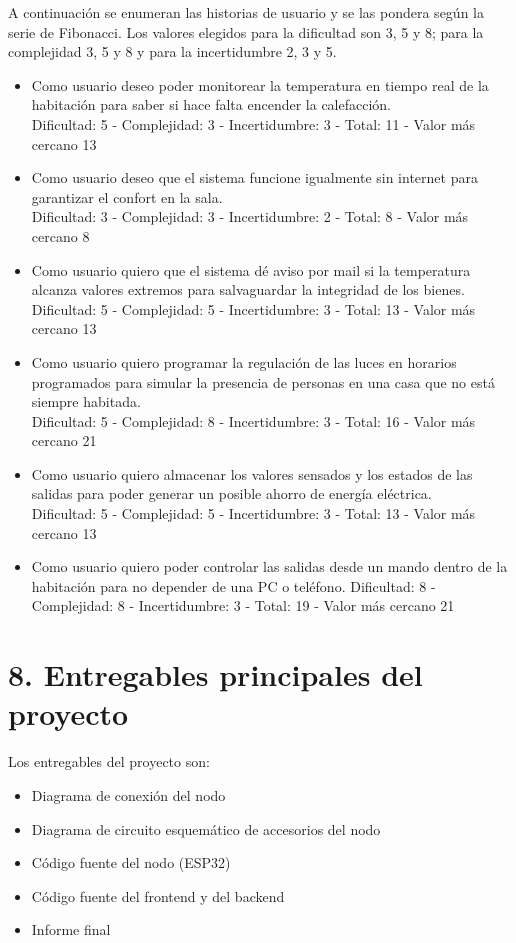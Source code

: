 \documentclass[
11pt, %
]{charter}
\begin{document}
A continuación se enumeran las historias de usuario y se las pondera según la serie de Fibonacci. Los valores elegidos para la dificultad son 3, 5 y 8; para la complejidad 3, 5 y 8 y para la incertidumbre 2, 3 y 5.
\begin{itemize}
	\item Como usuario deseo poder monitorear la temperatura en tiempo real de la habitación para saber si hace falta encender la calefacción. \\
Dificultad: 5 - Complejidad: 3 - Incertidumbre: 3	 - Total: 11 - Valor más cercano 13
	\item Como usuario deseo que el sistema funcione igualmente sin internet para garantizar el confort en la sala. \\
Dificultad: 3 - Complejidad: 3 - Incertidumbre: 2	 - Total: 8 - Valor más cercano 8	
	\item Como usuario quiero que el sistema dé aviso por mail si la temperatura alcanza valores extremos para salvaguardar la integridad de los bienes. \\
Dificultad: 5 - Complejidad: 5 - Incertidumbre: 3	 - Total: 13 - Valor más cercano 13
	\item Como usuario quiero programar la regulación de las luces en horarios programados para simular la presencia de personas en una casa que no está siempre habitada. \\
Dificultad: 5 - Complejidad: 8 - Incertidumbre: 3	 - Total: 16 - Valor más cercano 21
	\item Como usuario quiero almacenar los valores sensados y los estados de las salidas para poder generar un posible ahorro de energía eléctrica. \\
Dificultad: 5 - Complejidad: 5 - Incertidumbre: 3	 - Total: 13 - Valor más cercano 13
	\item Como usuario quiero poder controlar las salidas desde un mando dentro de la habitación para no depender de una PC o teléfono.
Dificultad: 8 - Complejidad: 8 - Incertidumbre: 3	 - Total: 19 - Valor más cercano 21
\end{itemize}

\section{8. Entregables principales del proyecto}
\label{sec:entregables}

Los entregables del proyecto son:

\begin{itemize}
	\item Diagrama de conexión del nodo
	\item Diagrama de circuito esquemático de accesorios del nodo
	\item Código fuente del nodo (ESP32)
	\item Código fuente del frontend y del backend 
	\item Informe final
\end{itemize}
\end{document}
